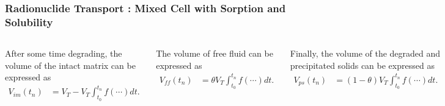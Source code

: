 \begin{frame}[ctb!]
  \frametitle{Radionuclide Transport : Mixed Cell with Sorption and Solubility}
  \footnotesize{
  \begin{columns}[c]
After some time degrading, the volume of the intact matrix can be expressed as
\begin{align}
V_{im}(t_n) &= V_T - V_T\int_{t_0}^{t_n} f(\cdots) dt.
\label{vim}
\end{align}

The volume of free fluid can be expressed as
\begin{align}
V_{ff}(t_n) &= \theta V_T \int_{t_0}^{t_n} f(\cdots) dt.
\label{vff}
\end{align}

Finally, the volume of the degraded and precipitated solids can be expressed as
\begin{align}
V_{ps}(t_n) &= (1 - \theta)V_T\int_{t_0}^{t_n} f(\cdots) dt.
\label{vps} 
\end{align}
 

  \begin{figure}[h!]
    \begin{center}
      \includegraphics[width=\textwidth]{cyder/images/mixed_cell_degraded.eps}
    \end{center}
  \end{figure}
\end{columns}
}
\end{frame}

